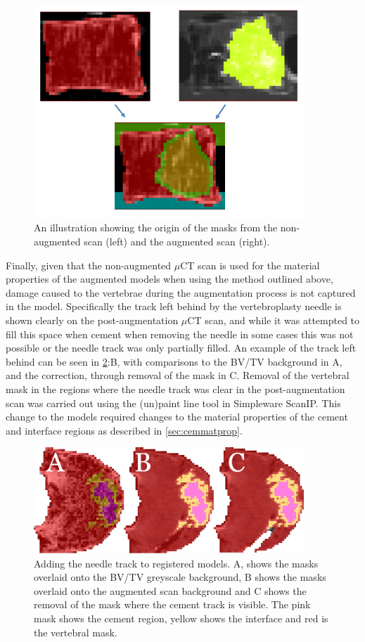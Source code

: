 \begin{figure}[ht!]
  \centering
  \includegraphics[width=4in]{Chapters/Chapter_HT_images/mask_demo.png}
  \caption{An illustration showing the origin of the masks from the
non-augmented scan (left) and the augmented scan (right).}
  \label{fig:mask_demo}
\end{figure}

Finally, given that the non-augmented $\mu$CT scan is used for the material
properties of the augmented models when using the method outlined above, damage
caused to the vertebrae during the augmentation process is not captured in the
model. Specifically the track left behind by the vertebroplasty needle is shown
clearly on the post-augmentation $\mu$CT scan, and while it was attempted to
fill this space when cement when removing the needle in some cases this was not
possible or the needle track was only partially filled. An example of the track
left behind can be seen in \cref{fig:needle_track}:B, with comparisons to the
BV/TV background in A, and the correction, through removal of the mask in C.
Removal of the vertebral mask in the regions where the needle track was clear
in the post-augmentation scan was carried out using the (un)paint line tool in
Simpleware ScanIP. This change to the models required changes to the material
properties of the cement and interface regions as described in
\cref{sec:cemmatprop}.

\begin{figure}[ht!]
  \centering
  \includegraphics[width=4in]{Chapters/Chapter_HT_images/needle_track.png}
  \caption[Adding the needle track to registered models.]{Adding the needle
track to registered models. A, shows the masks
overlaid onto the BV/TV greyscale background, B shows the masks overlaid onto
the augmented scan background and C shows the removal of the mask where the
cement track is visible. The pink mask shows the cement region, yellow shows
the
interface and red is the vertebral mask.}
  \label{fig:needle_track}
\end{figure}

